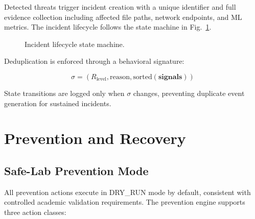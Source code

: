 \documentclass[conference]{IEEEtran}
\begin{document}
Detected threats trigger incident creation with a unique
identifier and full evidence collection including affected
file paths, network endpoints, and ML metrics. The incident
lifecycle follows the state machine in Fig.~\ref{fig:lifecycle}.

\begin{figure}[htbp]
\centering
{}
\caption{Incident lifecycle state machine.}
\label{fig:lifecycle}
\end{figure}

Deduplication is enforced through a behavioral signature:

\begin{equation}
\sigma = (R_{\text{level}}, \text{reason}, \text{sorted}(\mathbf{signals}))
\end{equation}

State transitions are logged only when $\sigma$ changes,
preventing duplicate event generation for sustained incidents.


\section{Prevention and Recovery}

\subsection{Safe-Lab Prevention Mode}

All prevention actions execute in DRY\_RUN mode by default,
consistent with controlled academic validation requirements.
The prevention engine supports three action classes:
\end{document}
